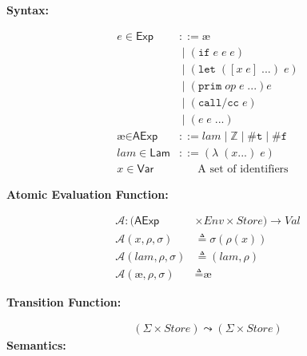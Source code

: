 \documentclass[12pt,draft]{article}
\newcommand\mae{\ensuremath{\text{\ae}}}
\newcommand{\lamsyn}[2]{(\lambda\;(#1 ...)\;#2)}
\newcommand{\letsyn}[3]{(\texttt{let}\;([#1\;#2]\;...)\;#3)}
\newcommand{\ifsyn}[3]{(\texttt{if}\;#1\;#2\;#3)}
\newcommand{\primsyn}[2]{(\texttt{prim}\;#1\;#2\;...)}
\newcommand{\callccsyn}[1]{(\texttt{call/cc}\;#1)}
\newcommand{\truesyn}{\texttt{\#t}}
\newcommand{\falsesyn}{\texttt{\#f}}
\begin{document}
\newpage


\begin{multicols*}{2}
\begin{center}
\textbf{Syntax:}
\end{center}
\vspace{-7mm}
\begin{align*}
e \in \textsf{Exp} &::= \mae \\
				  & \;|\; \ifsyn{e}{e}{e}  \\
				  & \;|\; \letsyn{x}{e}{e} \\
				  & \;|\; \primsyn{op}{e}{e} \\
				  & \;|\; \callccsyn{e} \\
				  & \;|\; (e \; e \; ...) \\
\mae \in \textsf{AExp} &::= lam \;|\; \mathbb{Z} \;|\; \truesyn \;|\; \falsesyn \\
lam \in \textsf{Lam} &::= \lamsyn{x}{e} \\
x \in \textsf{Var} &\;\;\;\;\;\; \text{A set of identifiers}
\end{align*}
\vspace{-10mm}
\begin{center}
\begin{center}
\textbf{Atomic Evaluation Function:}
\end{center}
\vspace{-7mm}
\begin{align*}
\mathcal{A} : (\textsf{AExp} & \times \textit{Env} \times \textit{Store}) \rightarrow Val \\
\mathcal{A}(x, \rho, \sigma) &\triangleq \sigma(\rho(x)) \\
\mathcal{A}(lam, \rho, \sigma) &\triangleq (lam , \rho) \\
\mathcal{A}(\mae, \rho, \sigma) &\triangleq \mae
\end{align*}
\vspace{-10mm}
\begin{center}
\textbf{Transition Function:}
\end{center}
\vspace{-7mm}
\begin{align*}
(\Sigma \times \textit{Store}) \leadsto (\Sigma \times \textit{Store})
\end{align*}
\vfill\null
\columnbreak
\textbf{Semantics:}
\end{center}
\vspace{-7mm}

\end{multicols*}
\end{document}
